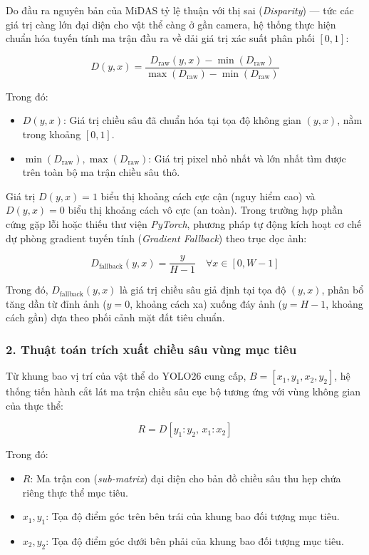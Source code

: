 Do đầu ra nguyên bản của MiDAS tỷ lệ thuận với thị sai (\textit{Disparity}) — tức các giá trị càng lớn đại diện cho vật thể càng ở gần camera, hệ thống thực hiện chuẩn hóa tuyến tính ma trận đầu ra về dải giá trị xác suất phân phối $[0, 1]$:

\begin{equation}
    D(y, x) = \frac{D_{\text{raw}}(y, x) - \min(D_{\text{raw}})}{\max(D_{\text{raw}}) - \min(D_{\text{raw}})}
\end{equation}

Trong đó:
\begin{itemize}
    \item $D(y, x)$: Giá trị chiều sâu đã chuẩn hóa tại tọa độ không gian $(y, x)$, nằm trong khoảng $[0, 1]$.
    \item $\min(D_{\text{raw}}), \max(D_{\text{raw}})$: Giá trị pixel nhỏ nhất và lớn nhất tìm được trên toàn bộ ma trận chiều sâu thô.
\end{itemize}

Giá trị $D(y, x) = 1$ biểu thị khoảng cách cực cận (nguy hiểm cao) và $D(y, x) = 0$ biểu thị khoảng cách vô cực (an toàn). Trong trường hợp phần cứng gặp lỗi hoặc thiếu thư viện \textit{PyTorch}, phương pháp tự động kích hoạt cơ chế dự phòng gradient tuyến tính (\textit{Gradient Fallback}) theo trục dọc ảnh:

\begin{equation}
    D_{\text{fallback}}(y, x) = \frac{y}{H - 1} \quad \forall x \in [0, W-1]
\end{equation}

Trong đó, $D_{\text{fallback}}(y, x)$ là giá trị chiều sâu giả định tại tọa độ $(y, x)$, phân bổ tăng dần từ đỉnh ảnh ($y=0$, khoảng cách xa) xuống đáy ảnh ($y=H-1$, khoảng cách gần) dựa theo phối cảnh mặt đất tiêu chuẩn.

\subsubsection*{2. Thuật toán trích xuất chiều sâu vùng mục tiêu}

Từ khung bao vị trí của vật thể do YOLO26 cung cấp, $B = [x_1, y_1, x_2, y_2]$, hệ thống tiến hành cắt lát ma trận chiều sâu cục bộ tương ứng với vùng không gian của thực thể:

\begin{equation}
    R = D[y_1:y_2, \, x_1:x_2]
\end{equation}

Trong đó:
\begin{itemize}
    \item $R$: Ma trận con (\textit{sub-matrix}) đại diện cho bản đồ chiều sâu thu hẹp chứa riêng thực thể mục tiêu.
    \item $x_1, y_1$: Tọa độ điểm góc trên bên trái của khung bao đối tượng mục tiêu.
    \item $x_2, y_2$: Tọa độ điểm góc dưới bên phải của khung bao đối tượng mục tiêu.
\end{itemize}

